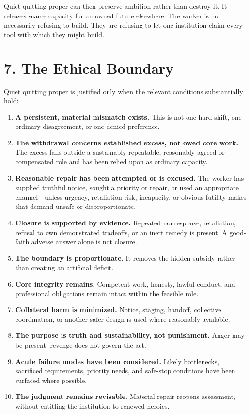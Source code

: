 \documentclass[11pt,oneside]{article}
\providecommand{\tightlist}{%
  \setlength{\itemsep}{0.22em}\setlength{\parskip}{0pt}}
\begin{document}
Quiet quitting proper can then preserve ambition rather than destroy it.
It releases scarce capacity for an owned future elsewhere. The worker is
not necessarily refusing to build. They are refusing to let one
institution claim every tool with which they might build.

\hypertarget{the-ethical-boundary}{%
\section{7. The Ethical Boundary}\label{the-ethical-boundary}}

Quiet quitting proper is justified only when the relevant conditions
substantially hold:

\begin{enumerate}
\def\labelenumi{\arabic{enumi}.}
\tightlist
\item
  \textbf{A persistent, material mismatch exists.} This is not one hard
  shift, one ordinary disagreement, or one denied preference.
\item
  \textbf{The withdrawal concerns established excess, not owed core
  work.} The excess falls outside a sustainably repeatable, reasonably
  agreed or compensated role and has been relied upon as ordinary
  capacity.
\item
  \textbf{Reasonable repair has been attempted or is excused.} The
  worker has supplied truthful notice, sought a priority or repair, or
  used an appropriate channel - unless urgency, retaliation risk,
  incapacity, or obvious futility makes that demand unsafe or
  disproportionate.
\item
  \textbf{Closure is supported by evidence.} Repeated nonresponse,
  retaliation, refusal to own demonstrated tradeoffs, or an inert remedy
  is present. A good-faith adverse answer alone is not closure.
\item
  \textbf{The boundary is proportionate.} It removes the hidden subsidy
  rather than creating an artificial deficit.
\item
  \textbf{Core integrity remains.} Competent work, honesty, lawful
  conduct, and professional obligations remain intact within the
  feasible role.
\item
  \textbf{Collateral harm is minimized.} Notice, staging, handoff,
  collective coordination, or another safer design is used where
  reasonably available.
\item
  \textbf{The purpose is truth and sustainability, not punishment.}
  Anger may be present; revenge does not govern the act.
\item
  \textbf{Acute failure modes have been considered.} Likely bottlenecks,
  sacrificed requirements, priority needs, and safe-stop conditions have
  been surfaced where possible.
\item
  \textbf{The judgment remains revisable.} Material repair reopens
  assessment, without entitling the institution to renewed heroics.
\end{enumerate}
\end{document}
